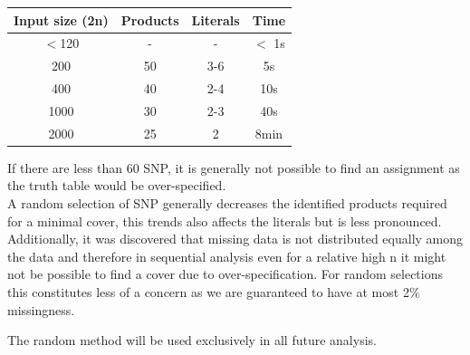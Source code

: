 \documentclass[letterpaper, 11pt]{article}
\begin{document}
\begin{center}
\begin{tabular}{ c| c| c| c}
 \textbf{Input size (2n)} & \textbf{Products} & \textbf{Literals} & \textbf{Time} \\ \hline
 $<$120& -&-&$<$ 1s\\
 200 & 50 & 3-6&5s\\  
 400 & 40 & 2-4  & 10s \\
 1000& 30&2-3&40s\\
 2000&25&2&8min
\end{tabular}
\end{center}

If there are less than 60 SNP, it is generally not possible to find an assignment as the truth table would be over-specified. \\

A random selection of SNP generally decreases the identified products required for a minimal cover, this trends also affects the literals but is less pronounced. Additionally, it was discovered that missing data is not distributed equally among the data and therefore in sequential analysis even for a relative high n it might not be possible to find a cover due to over-specification. For random selections this constitutes less of a concern as we are guaranteed to have at most 2\% missingness.  
\begin{figure}[h]
\end{figure}

The random method will be used exclusively in all future analysis. \\
\end{document}

